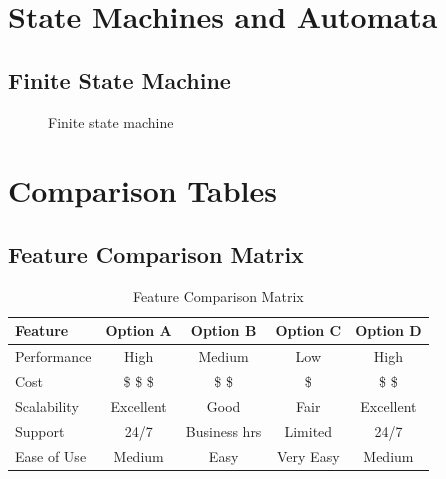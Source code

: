 \documentclass[a4paper,12pt]{article}
\begin{document}
\section{State Machines and Automata}

\subsection{Finite State Machine}
\begin{figure}[H]
\centering
{}
\caption{Finite state machine}
\label{fig:fsm}
\end{figure}

\section{Comparison Tables}

\subsection{Feature Comparison Matrix}
\begin{table}[H]
\centering
\caption{Feature Comparison Matrix}
\label{tab:comparison}
\begin{tabular}{lcccc}
\toprule
\rowcolor{primary!20}
\textbf{Feature} & \textbf{Option A} & \textbf{Option B} & \textbf{Option C} & \textbf{Option D} \\
\midrule
Performance & \cellcolor{green!20}High & \cellcolor{yellow!20}Medium & \cellcolor{red!20}Low & \cellcolor{green!20}High \\
Cost & \cellcolor{red!20}\$ \$ \$ & \cellcolor{yellow!20}\$ \$ & \cellcolor{green!20}\$ & \cellcolor{yellow!20}\$ \$ \\
Scalability & \cellcolor{green!20}Excellent & \cellcolor{green!20}Good & \cellcolor{yellow!20}Fair & \cellcolor{green!20}Excellent \\
Support & \cellcolor{green!20}24/7 & \cellcolor{yellow!20}Business hrs & \cellcolor{red!20}Limited & \cellcolor{green!20}24/7 \\
Ease of Use & \cellcolor{yellow!20}Medium & \cellcolor{green!20}Easy & \cellcolor{green!20}Very Easy & \cellcolor{yellow!20}Medium \\
\bottomrule
\end{tabular}
\end{table}
\end{document}
